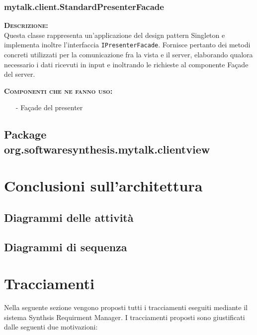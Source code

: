 \subsubsection{mytalk.client.StandardPresenterFacade}
\begin{description}
	\item{\scshape\bfseries Descrizione:}\\
Questa classe rappresenta un'applicazione del design pattern Singleton e implementa inoltre l'interfaccia \texttt{IPresenterFacade}. Fornisce pertanto dei metodi concreti utilizzati per la comunicazione fra la vista e il server, elaborando qualora necessario i dati ricevuti in input e inoltrando le richieste al componente Façade del server.
	\item{\scshape\bfseries Componenti che ne fanno uso:}
	\begin{itemize}[noitemsep,nolistsep]
	  \item[-] Façade del presenter
	\end{itemize}
\end{description}

\subsection{Package org.softwaresynthesis.mytalk.clientview}
\clearpage

\section{Conclusioni sull'architettura}

\subsection{Diagrammi delle attività}

\subsection{Diagrammi di sequenza}
\clearpage

\section{Tracciamenti}
Nella seguente sezione vengono proposti tutti i tracciamenti eseguiti mediante il sistema Synthsis Requirment Manager. I tracciamenti proposti sono giustificati dalle seguenti due motivazioni:

